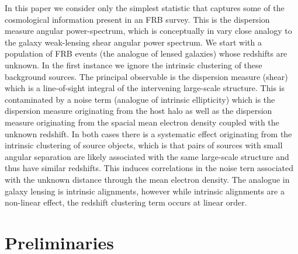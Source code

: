 \documentclass[onecolumn,prd,noshowpacs,nofootinbib,amsmath,amssymb]{revtex4}
\begin{document}
In this paper we consider only the simplest statistic that captures some of
the cosmological information present in an FRB survey.  This is the dispersion
measure angular power-spectrum, which is conceptually in vary close analogy to
the galaxy weak-lensing shear angular power spectrum. We start with a
population of FRB events (the analogue of lensed galaxies) whose redshifts are
unknown.  In the first instance we ignore the intrinsic clustering of these
background sources.  The principal observable is the dispersion measure
(shear) which is a line-of-sight integral of the intervening large-scale
structure.  This is contaminated by a noise term (analogue of intrinsic
ellipticity) which is the dispersion
measure originating from the host halo as well as the dispersion measure
originating from the spacial mean electron density coupled with the unknown
redshift.  In both cases there is a systematic effect originating from the
intrinsic clustering of source objects, which is that pairs of sources with
small angular separation are likely associated with the same large-scale
structure and thus have similar redshifts.  This induces correlations in the
noise tern associated with the unknown distance through the mean electron
density. The analogue in galaxy lensing is intrinsic alignments, however while
intrinsic alignments are a non-linear effect, the redshift clustering term occurs
at linear order.


\section{Preliminaries}

\end{document}
